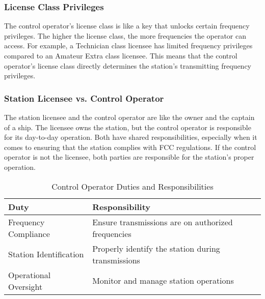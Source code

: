 \subsubsection*{License Class Privileges}
The control operator's license class is like a key that unlocks certain frequency privileges. The higher the license class, the more frequencies the operator can access. For example, a Technician class licensee has limited frequency privileges compared to an Amateur Extra class licensee. This means that the control operator's license class directly determines the station's transmitting frequency privileges.

\subsubsection*{Station Licensee vs. Control Operator}
The station licensee and the control operator are like the owner and the captain of a ship. The licensee owns the station, but the control operator is responsible for its day-to-day operation. Both have shared responsibilities, especially when it comes to ensuring that the station complies with FCC regulations. If the control operator is not the licensee, both parties are responsible for the station's proper operation.



\begin{table}[h]
    \centering
    \begin{tabular}{|l|l|}
        \hline
        \textbf{Duty} & \textbf{Responsibility} \\
        \hline
        Frequency Compliance & Ensure transmissions are on authorized frequencies \\
        Station Identification & Properly identify the station during transmissions \\
        Operational Oversight & Monitor and manage station operations \\
        \hline
    \end{tabular}
    \caption{Control Operator Duties and Responsibilities}
    \label{tab:control-operator-duties}
\end{table}

